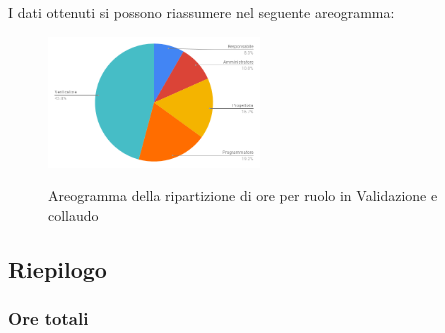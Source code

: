 I dati ottenuti si possono riassumere nel seguente areogramma:
\begin{figure}[H] 
			\centering 
				\includegraphics[width=0.5\textwidth]{res/images/areogramma_validazione.png}\\
				\caption{Areogramma della ripartizione di ore per ruolo in Validazione e collaudo}
			\label{AreogrammaValidazione}
\end{figure}


\subsection{Riepilogo}
\subsubsection{Ore totali}
